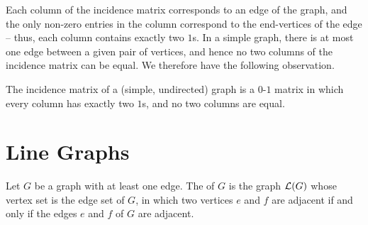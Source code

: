 Each column of the incidence matrix corresponds to an edge of the graph, and the only non-zero entries in the column correspond to the end-vertices of the edge -- thus, each column contains exactly two $1$s. In a simple graph, there is at most one edge between a given pair of vertices, and hence no two columns of the incidence matrix can be equal. We therefore have the following observation.

\begin{Observation}
The incidence matrix of a (simple, undirected) graph is a $0$-$1$ matrix in which every column has exactly two $1$s, and no two columns are equal.
\end{Observation}


\section{Line Graphs}\label{sec:LineGraphs}

Let $G$ be a graph with at least one edge. The  of $G$ is the graph $\operatorname{\mathcal L}(G)$ whose vertex set is the edge set of $G$, in which two vertices $e$ and $f$ are adjacent if and only if the edges $e$ and $f$ of $G$ are adjacent.

